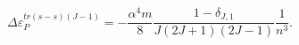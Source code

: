 \begin{equation}
\Delta \varepsilon _{P}^{tr\left( s-s\right) (J-1)}=-\frac{\alpha ^{4}m}{8}%
\frac{1-\delta _{J,1}}{J\left( 2J+1\right) \left( 2J-1\right) }\frac{1}{n^{3}%
}.
\end{equation}

